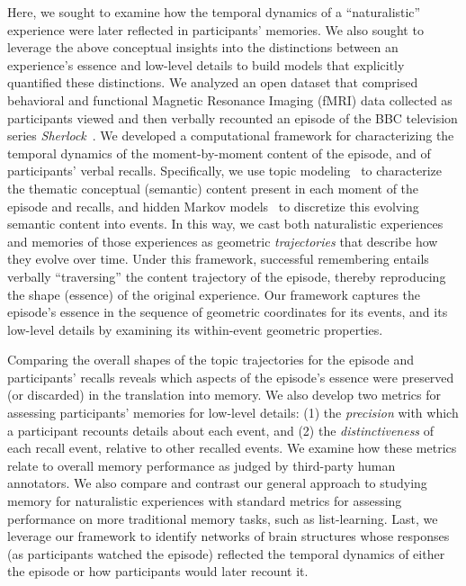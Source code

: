 \documentclass{article}
\begin{document}
Here, we sought to examine how the temporal dynamics of a ``naturalistic'' experience were later reflected in participants' memories.  We also sought to leverage the above conceptual insights into the distinctions between an experience's essence and low-level details to build models that explicitly quantified these distinctions.  We analyzed an open dataset that comprised behavioral and functional Magnetic Resonance Imaging (fMRI) data collected as participants viewed and then verbally recounted an episode of the BBC television series \textit{Sherlock}~\citep{ChenEtal17}.  We developed a computational framework for characterizing the temporal dynamics of the moment-by-moment content of the episode, and of participants' verbal recalls.  Specifically, we use topic modeling~\citep{BleiEtal03} to characterize the thematic conceptual (semantic) content present in each moment of the episode and recalls, and hidden Markov models~\citep{Rabi89, BaldEtal17} to discretize this evolving semantic content into events.  In this way, we cast both naturalistic experiences and memories of those experiences as geometric \textit{trajectories} that describe how they evolve over time. Under this framework, successful remembering entails verbally ``traversing'' the content trajectory of the episode, thereby reproducing the shape (essence) of the original experience.  Our framework captures the episode's essence in the sequence of geometric coordinates for its events, and its low-level details by examining its within-event geometric properties.

Comparing the overall shapes of the topic trajectories for the episode and participants' recalls reveals which aspects of the episode's essence were preserved (or discarded) in the translation into memory.  We also develop two metrics for assessing participants' memories for low-level details: (1) the \textit{precision} with which a participant recounts details about each event, and (2) the \textit{distinctiveness} of each recall event, relative to other recalled events.  We examine how these metrics relate to overall memory performance as judged by third-party human annotators.  We also compare and contrast our general approach to studying memory for naturalistic experiences with standard metrics for assessing performance on more traditional memory tasks, such as list-learning.  Last, we leverage our framework to identify networks of brain structures whose responses (as participants watched the episode) reflected the temporal dynamics of either the episode or how participants would later recount it.
\end{document}
